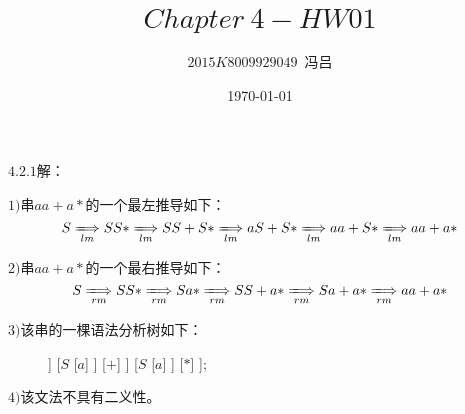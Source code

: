 \documentclass[UTF8,noindent]{ctexart}
\title{$Chapter\ 4-HW01$}
\author{$2015K8009929049$\ 冯吕}
\date{\today}
\begin{document}
\maketitle
{}
$4.2.1$解：

$1)$串$aa+a*$的一个最左推导如下：
\[S\xLongrightarrow[lm]{} SS*\xLongrightarrow[lm]{} SS+S*\xLongrightarrow[lm]{} aS+S*\xLongrightarrow[lm]{} aa+S*\xLongrightarrow[lm]{} aa+a*\]

$2)$串$aa+a*$的一个最右推导如下：
\[S\xLongrightarrow[rm]{} SS*\xLongrightarrow[rm]{} Sa*\xLongrightarrow[rm]{} SS+a*\xLongrightarrow[rm]{} Sa+a*\xLongrightarrow[rm]{} aa+a*\]

$3)$该串的一棵语法分析树如下：
\begin{figure}[H]
\centering
\begin{forest}
  [{$S$}
	[{$S$}
	  [{$S$}
		[{$a$}]
	  ]
	  [{$S$}
		[{$a$}]
	  ]
	  [{$+$}]
	]
	[{$S$}
	  [{$a$}]
	]
	[{$*$}]
  ];
\end{forest}
\end{figure}

$4)$该文法不具有二义性。
\end{document}
